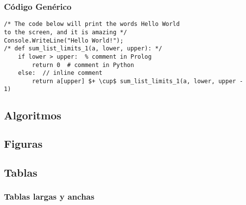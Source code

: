 \documentclass[twoside]{tfg-urjc}
\begin{document}
\subsubsection{Código Genérico}

\begin{lstlisting}
/* The code below will print the words Hello World
to the screen, and it is amazing */
Console.WriteLine("Hello World!"); 
/* def sum_list_limits_1(a, lower, upper): */
    if lower > upper:  % comment in Prolog
        return 0  # comment in Python 
    else:  // inline comment
        return a[upper] $+ \cup$ sum_list_limits_1(a, lower, upper - 1)
\end{lstlisting}


\subsection{Algoritmos}

\subsection{Figuras}

\subsection{Tablas} 


\subsubsection{Tablas largas y anchas}
\end{document}
